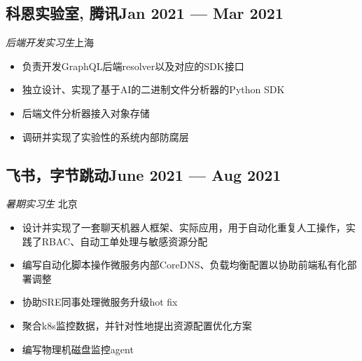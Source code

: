 \documentclass[a4,12pt]{article}
\newcommand{\subtext}[1]{
#1\par\vspace{-0.3cm}}
\newenvironment{zitemize}{
\begin{itemize}\itemsep0pt \parskip0pt \parsep1pt}
{\end{itemize}\vspace{-0.5cm}}
\begin{document}
        

\subsection*{科恩实验室, 腾讯\hfill Jan 2021 --- Mar 2021} 
\subtext{\textit{后端开发实习生}\hfill 上海} 
    \begin{zitemize}
        \item 负责开发GraphQL后端resolver以及对应的SDK接口
        \item 独立设计、实现了基于AI的二进制文件分析器的Python SDK
        \item 后端文件分析器接入对象存储
        \item 调研并实现了实验性的系统内部防腐层
    \end{zitemize}


\subsection*{飞书，字节跳动\hfill June 2021 --- Aug 2021} 
\subtext{\textit{暑期实习生} \hfill 北京} 
    \begin{zitemize}
        \item 设计并实现了一套聊天机器人框架、实际应用，用于自动化重复人工操作，实践了RBAC、自动工单处理与敏感资源分配
        \item 编写自动化脚本操作微服务内部CoreDNS、负载均衡配置以协助前端私有化部署调整
        \item 协助SRE同事处理微服务升级hot fix
        \item 聚合k8s监控数据，并针对性地提出资源配置优化方案
        \item 编写物理机磁盘监控agent
    \end{zitemize}
\end{document}
